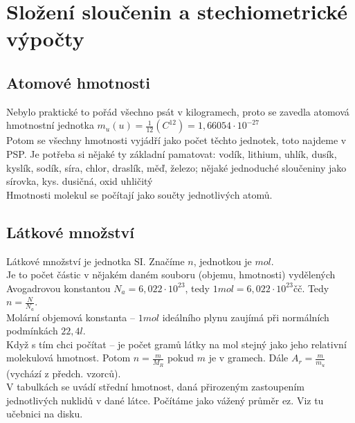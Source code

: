 \documentclass{article}
\begin{document}
\section{Složení sloučenin a stechiometrické výpočty}

\subsection{Atomové hmotnosti}
Nebylo praktické to pořád všechno psát v kilogramech, proto se zavedla atomová hmotnostní jednotka $m_u (u) = \frac{1}{12}(C^{12}) = 1,66054 \cdot 10^{-27}$\\
Potom se všechny hmotnosti vyjádří jako počet těchto jednotek, toto najdeme v PSP. Je potřeba si nějaké ty základní pamatovat: vodík, lithium, uhlík, dusík, kyslík, sodík, síra, chlor, draslík, měď, železo; nějaké jednoduché sloučeniny jako sírovka, kys. dusičná, oxid uhličitý\\
Hmotnosti molekul se počítají jako součty jednotlivých atomů.

\subsection{Látkové množství}
Látkové množství je jednotka SI. Značíme $n$, jednotkou je $mol$.\\
Je to počet částic v nějakém daném souboru (objemu, hmotnosti) vydělených Avogadrovou konstantou $N_a = 6,022 \cdot 10^23$, tedy $1 mol = 6,022 \cdot 10^23 \text{čč}$. Tedy $n = \frac{N}{N_a}$.\\
Molární objemová konstanta -- $1 mol$ ideálního plynu zaujímá při normálních podmínkách $22,4 l$.\\
Když s tím chci počítat --  je počet gramů látky na mol stejný jako jeho relativní molekulová hmotnost. Potom $n = \frac{m}{M_R}$ pokud $m$ je v gramech. Dále $A_r = \frac{m}{m_u}$ (vychází z předch. vzorců).\\
V tabulkách se uvádí střední hmotnost, daná přirozeným zastoupením jednotlivých nuklidů v dané látce. Počítáme jako vážený průměr ez. Viz tu učebnici na disku.
\end{document}
